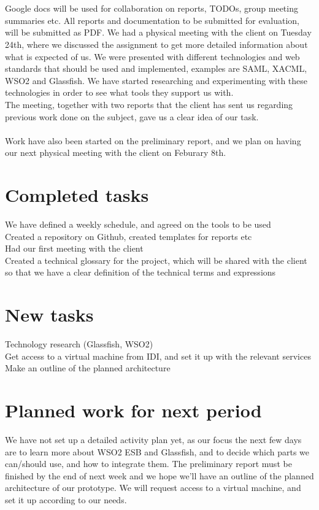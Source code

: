 \documentclass[titlepage]{article}
\begin{document}
\\\\
        Google docs will be used for collaboration on reports, TODOs, group meeting summaries etc. All reports and documentation to be submitted for evaluation, will be submitted as PDF.
We had a physical meeting with the client on Tuesday 24th, where we discussed the assignment to get more detailed information about what is expected of us. We were presented with different technologies and web standards that should be used and implemented, examples are SAML, XACML, WSO2 and Glassfish. We have started researching and experimenting with these technologies in order to see what tools they support us with. 
\\The meeting, together with two reports that the client has sent us regarding previous work done on the subject, gave us a clear idea of our task.
\\\\
        Work have also been started on the preliminary report, and we plan on having our next physical meeting with the client on Feburary 8th.


    \section*{Completed tasks}
        We have defined a weekly schedule, and agreed on the tools to be used
\\Created a repository on Github, created templates for reports etc
\\Had our first meeting with the client
\\Created a technical glossary for the project, which will be shared with the client so that we have a clear definition of the technical terms and expressions

    \section*{New tasks}
        Technology research (Glassfish, WSO2)
\\Get access to a virtual machine from IDI, and set it up with the relevant services
\\Make an outline of the planned architecture

    \section*{Planned work for next period}
        We have not set up a detailed activity plan yet, as our focus the next few days are to learn more about WSO2 ESB and Glassfish, and to decide which parts we can/should use, and how to integrate them. The preliminary report must be finished by the end of next week and we hope we’ll have an outline of the planned architecture of our prototype. We will request access to a virtual machine, and set it up according to our needs.
\end{document}

